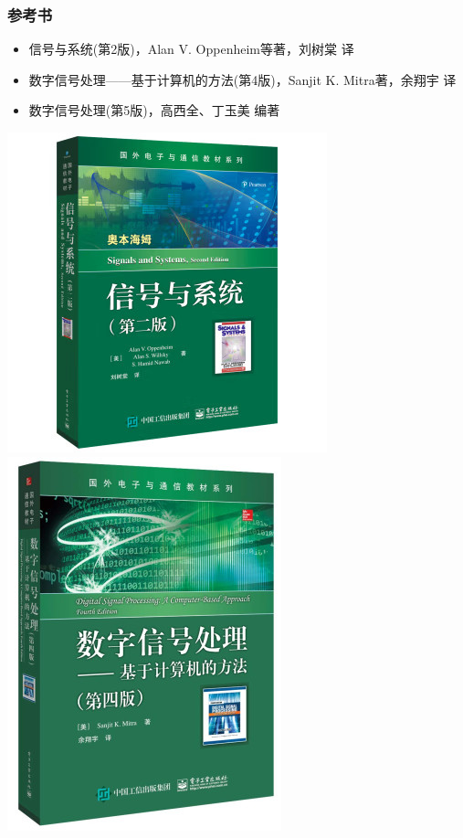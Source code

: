 \documentclass[CJKutf8,xcolor=pdftex,dvipsnames,table]{beamer}
\begin{document}
\begin{CJK*}{UTF8}{song}
  \begin{frame}
    \frametitle{参考书}
    \begin{itemize}
    \item 信号与系统(第2版)，Alan V. Oppenheim等著，刘树棠 译
    \item 数字信号处理——基于计算机的方法(第4版)，Sanjit K. Mitra著，余翔宇 译
    \item 数字信号处理(第5版)，高西全、丁玉美 编著    
    \end{itemize}
    \begin{center}
      \includegraphics[scale=.31]{signalsandsystems}
      \hspace{1mm}
      \includegraphics[scale=.35]{mitradsp}

\end{center}
\end{frame}
\end{CJK*}
\end{document}
